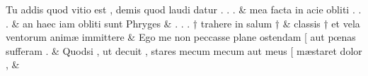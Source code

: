 \documentclass[12pt,onecolumn,twoside,a4paper]{memoir}
\begin{document}
\begin{pairs}
\begin{Leftside}
                              Tu
                              addis
                              quod
                              vitio
                              est
                              ,
                              demis
                              quod
                              laudi
                              datur
                              .
                              .
                              . \&
                         \stanza {}
                     mea
                              facta
                              in
                              acie
                              obliti
                              .
                              .
                              . \&
                         \stanza {}
                     an
                              haec
                              iam
                              obliti
                              sunt
                              Phryges \&
                         \stanza {}.
                              .
                              .
                              †
                              trahere
                              in
                              salum
                              † & 
                     classis
                              †
                              et
                              vela
                              ventorum
                              animæ
                              immittere \&
                         \stanza {}
                     Ego
                              me
                              non
                              peccasse
                              plane
                              ostendam
                              [
                              aut
                              pœnas
                              sufferam
                              . \&
                         \stanza {}Quodsi
                              ,
                              ut
                              decuit
                              ,
                              stares
                              mecum
                              {mecum}
                              aut
                              meus
                              [
                              mæstaret
                              dolor
                              , & 
                     

\end{Leftside}
\end{pairs}
\end{document}
